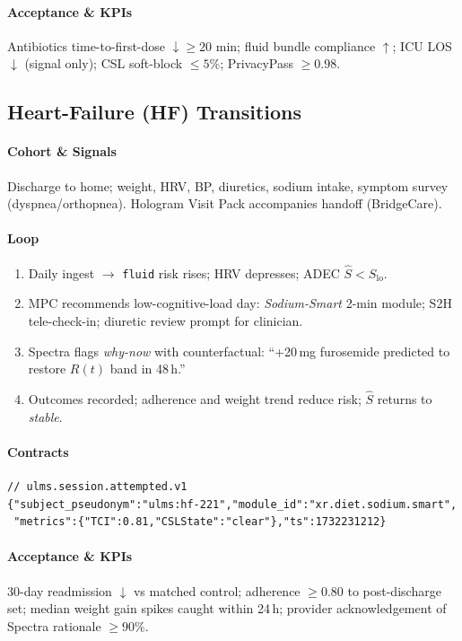 \documentclass[11pt]{article}
\theoremstyle{plain}
\begin{document}
\paragraph{Acceptance \& KPIs}
Antibiotics time-to-first-dose $\downarrow \ge 20$ min; fluid bundle compliance $\uparrow$; ICU LOS $\downarrow$ (signal only); CSL soft-block $\le 5\%$; PrivacyPass $\ge 0.98$.

\subsection{Heart-Failure (HF) Transitions}
\paragraph{Cohort \& Signals}
Discharge to home; weight, HRV, BP, diuretics, sodium intake, symptom survey (dyspnea/orthopnea). Hologram Visit Pack accompanies handoff (BridgeCare).
\paragraph{Loop}
\begin{enumerate}
  \item Daily ingest $\rightarrow$ \texttt{fluid} risk rises; HRV depresses; ADEC $\hat S< S_{\mathrm{lo}}$.
  \item MPC recommends low-cognitive-load day: \textit{Sodium-Smart} 2-min module; S2H tele-check-in; diuretic review prompt for clinician.
  \item Spectra flags \emph{why-now} with counterfactual: “+20\,mg furosemide predicted to restore $R(t)$ band in 48\,h.”
  \item Outcomes recorded; adherence and weight trend reduce risk; $\hat S$ returns to \textit{stable}.
\end{enumerate}
\paragraph{Contracts}
\begin{verbatim}
// ulms.session.attempted.v1
{"subject_pseudonym":"ulms:hf-221","module_id":"xr.diet.sodium.smart",
 "metrics":{"TCI":0.81,"CSLState":"clear"},"ts":1732231212}
\end{verbatim}
\paragraph{Acceptance \& KPIs}
30-day readmission $\downarrow$ vs matched control; adherence $\ge 0.80$ to post-discharge set; median weight gain spikes caught within 24\,h; provider acknowledgement of Spectra rationale $\ge 90\%$.
\end{document}
